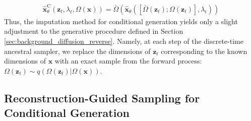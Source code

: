 \documentclass[ oneside,%
                    author={George Herbert},
                    degree={MSci},
                     title={Video Diffusion Models for Climate Simulations},
                  subtitle={}]{dissertation}
\begin{document}
\begin{align}
      \hat{\mathbf{x}}^{\mathrm{C}}_\theta(\mathbf{z}_t, \lambda_t, \Omega(\mathbf{x}))=\bar\Omega\left(\hat{\mathbf{x}}_\theta([\bar\Omega(\mathbf{z}_t); \Omega(\mathbf{z}_t)], \lambda_t )\right)
\end{align}
Thus, the imputation method for conditional generation yields only a slight adjustment to the generative procedure defined in Section \ref{sec:background_diffusion_reverse}. Namely, at each step of the discrete-time ancestral sampler, we replace the dimensions of $\mathbf{z}_t$ corresponding to the known dimensions of $\mathbf{x}$ with an exact sample from the forward process: $\Omega(\mathbf{z}_t)\sim q(\Omega(\mathbf{z}_t)|\Omega(\mathbf{x}))$.

\subsection{Reconstruction-Guided Sampling for Conditional Generation}
\label{sec:background_diffusion_reconstruction_guided_sampling}
\end{document}

